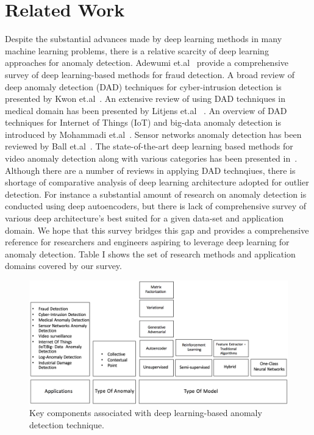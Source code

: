 \section{Related Work}
Despite the substantial advances made by deep learning methods in many machine learning problems, there
is a relative scarcity of deep learning approaches for anomaly detection. Adewumi et.al~\cite{adewumi2017survey} provide a comprehensive survey of deep learning-based methods for fraud detection. A broad review of deep anomaly detection (DAD) techniques for cyber-intrusion detection is presented by Kwon et.al~\cite{kwon2017survey}. An extensive review of using DAD techniques in medical domain has been presented by Litjens et.al ~\cite{litjens2017survey}. An  overview of DAD techniques for Internet of Things (IoT) and  big-data anomaly detection is introduced by  Mohammadi et.al~\cite{mohammadi2017deep}. Sensor networks anomaly detection has been reviewed  by  Ball et.al~\cite{ball2017comprehensive}. The state-of-the-art deep learning based methods for video anomaly detection along with various categories has been presented in~\cite{kiran2018overview}. Although there are a number of reviews in applying DAD technqiues, there is shortage of comparative analysis of deep learning architecture adopted for outlier detection. For instance a substantial amount of research on anomaly detection is conducted using deep autoencoders, but there is lack of comprehensive survey of various deep architecture's best suited for a given data-set and application domain. We hope that this survey bridges this gap and provides a comprehensive reference for researchers and engineers aspiring to leverage deep learning for anomaly detection. Table I shows the set of research methods and application domains covered by our survey.


\begin{figure}[h]
\includegraphics[scale=0.5]{images/AnomalyDetectionTaxonomy}
\caption{Key components associated with deep learning-based anomaly detection technique.}
\label{fig:surveyTaxonomy}
\end{figure}

